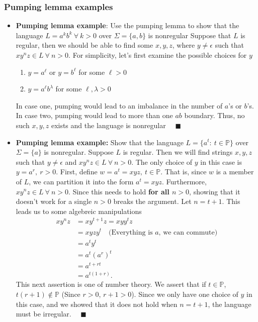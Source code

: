 \documentclass{report}
\begin{document}
    \subsubsection{Pumping lemma examples}
    \begin{itemize}
 \item \textbf{Pumping lemma example}: Use the pumping lemma to show that the language $L = a^{k}b^{k}\ \forall\ k > 0$ over $\Sigma = \{a,b\}$ is nonregular
    \bigbreak \noindent
    Suppose that $L$ is regular, then we should be able to find some $x,y,z$, where $y \ne \epsilon$ such that $xy^{n}z \in L\ \forall\ n > 0$. For simplicity, let's first examine the possible choices for $y$
    \begin{enumerate}
        \item $y = a^{\ell}$ or $y=b^{\ell}$ for some $\ell > 0$
        \item $y = a^{\ell}b^{\lambda}$ for some $\ell, \lambda > 0$
    \end{enumerate}
    In case one, pumping would lead to an imbalance in the number of $a$'s or $b$'s. In case two, pumping would lead to more than one $ab$ boundary.
    \bigbreak \noindent 
    Thus, no such $x,y,z$ exists and the language is nonregular $\quad \blacksquare $
    \bigbreak \noindent 
\item \textbf{Pumping lemma example:} Show that the language $L =  \{a^{t}:\ t \in \mathbb{P}\} $ over $\Sigma = \{a\}$ is nonregular.
    \bigbreak \noindent 
    Suppose $L$ is regular. Then we will find strings $x,y,z$ such that $y\ne \epsilon$ and $xy^{n}z \in L\ \forall\ n>0$.
    \bigbreak \noindent 
     The only choice of $y$ in this case is $y=a^{r},\ r>0$. 
     \bigbreak \noindent 
    First, define $w = a^{t} = xyz,\ t \in \mathbb{P}$. That is, since $w$ is a member of $L$, we can partition it into the form $a^{t} = xyz$. Furthermore, $xy^{n}z \in L\ \forall\ n>0$. Since this needs to hold \textbf{for all $n>0$}, showing that it doesn't work for a single $n>0$ breaks the argument. Let $n = t+1$. This leads us to some algebreic manipulations
    \begin{align*}
        xy^{n}z &= xy^{t+1}z = xyy^{t}z \\
                &=xyzy^{t} \quad \text{(Everything is $a$, we can commute)} \\
                &=a^{t}y^{t} \\
                &=a^{t}(a^{r})^{t} \\
                &= a^{t + rt} \\
                &= a^{t(1+r)}
    .\end{align*}
    This next assertion is one of number theory. We assert that if $t\in \mathbb{P}$, $t(r+1) \not\in \mathbb{P}$ (Since $r>0$, $r+1 > 0 $). 
    \bigbreak \noindent 
    Since we only have one choice of $y$ in this case, and we showed that it does not hold when $n=t+1$, the language must be irregular. $\quad \blacksquare $
 

\end{itemize}
\end{document}
